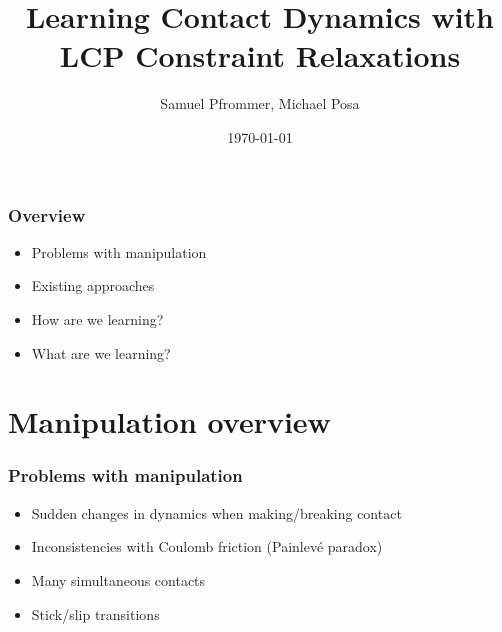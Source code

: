 \documentclass{beamer}
\title{Learning Contact Dynamics with LCP Constraint Relaxations}
\author{Samuel Pfrommer, Michael Posa}
\institute{DAIR Lab at the University of Pennsylvania}
\date{\today}
\begin{document}

\begin{frame}
    \titlepage
\end{frame}

\begin{frame}
    \frametitle{Overview}
    \begin{itemize}
        \item Problems with manipulation
        \item Existing approaches
        \item How are we learning?
        \item What are we learning?
    \end{itemize}
\end{frame}

\section{Manipulation overview}

\begin{frame}
    \frametitle{Problems with manipulation}
    \begin{itemize}
        \item Sudden changes in dynamics when making/breaking contact 
        \item Inconsistencies with Coulomb friction (Painlev\'{e} paradox)
        \item Many simultaneous contacts
        \item Stick/slip transitions
    \end{itemize}
\end{frame}
\end{document}
